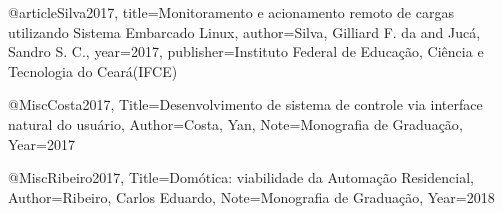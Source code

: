 @article{Silva2017,
  title={Monitoramento e acionamento remoto de cargas utilizando Sistema Embarcado Linux},
  author={Silva, Gilliard F. da and Jucá, Sandro S. C.},
  year={2017},
  publisher={Instituto Federal de Educação, Ciência e Tecnologia do Ceará(IFCE)}
}

@Misc{Costa2017,
  Title={Desenvolvimento de sistema de controle via interface natural do usuário},
  Author={Costa, Yan},
  Note={Monografia de Graduação},
  Year={2017}
}

@Misc{Ribeiro2017,
  Title={Domótica: viabilidade da Automação Residencial},
  Author={Ribeiro, Carlos Eduardo},
  Note={Monografia de Graduação},
  Year={2018}
}